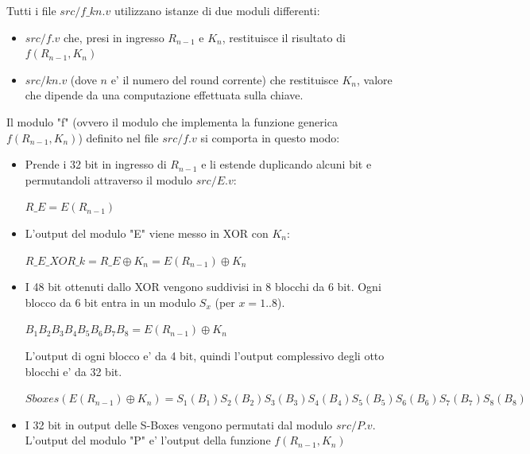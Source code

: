 \documentclass[a4paper]{article}
\begin{document}
Tutti i file $src/f\_kn.v$ utilizzano istanze di due moduli differenti:
\begin{itemize}
    \item $src/f.v$ che, presi in ingresso $R_{n-1}$ e $K_{n}$, restituisce il risultato di $f(R_{n-1}, K_n)$
    \item $src/kn.v$ (dove $n$ e' il numero del round corrente) che restituisce $K_n$, valore che dipende da una computazione effettuata sulla chiave.

\end{itemize}

Il modulo "f" (ovvero il modulo che implementa la funzione generica $f(R_{n-1}, K_n)$) definito nel file $src/f.v$ si comporta in questo modo:
\begin{itemize}
    \item Prende i 32 bit in ingresso di $R_{n-1}$ e li estende duplicando alcuni bit e permutandoli attraverso il modulo $src/E.v$:
          
          $R\_E = E(R_{n-1})$

    \item L'output del modulo "E" viene messo in XOR con $K_n$: 
    
          $R\_E\_XOR\_k = R\_E \oplus K_n = E(R_{n-1}) \oplus K_n$
    
    \item I 48 bit ottenuti dallo XOR vengono suddivisi in 8 blocchi da 6 bit. Ogni blocco da 6 bit entra in un modulo $S_x$ (per $x = 1 .. 8$).

          $B_1B_2B_3B_4B_5B_6B_7B_8 = E(R_{n-1}) \oplus K_n$



          L'output di ogni blocco e' da 4 bit, quindi l'output complessivo degli otto blocchi e' da 32 bit.

          $Sboxes(E(R_{n-1}) \oplus K_n) = S_1(B_1)S_2(B_2)S_3(B_3)S_4(B_4)S_5(B_5)S_6(B_6)S_7(B_7)S_8(B_8)$

    \item I 32 bit in output delle S-Boxes vengono permutati dal modulo $src/P.v$. L'output del modulo "P" e' l'output della funzione $f(R_{n-1}, K_n)$

\end{itemize}
\end{document}
